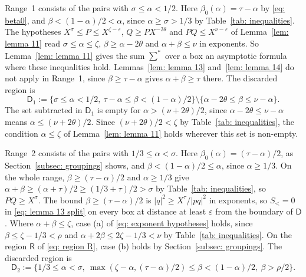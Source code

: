 \documentclass{article}
\numberwithin{equation}{section}
\newcommand{\Le}{\leqslant}
\newcommand{\Ge}{\geqslant}
\begin{document}
Range~1 consists of the pairs with $\sigma \Le \alpha < 1/2$. Here $\beta_0(\alpha) = \tau - \alpha$ by \eqref{eq: beta0}, and $\beta < (1 - \alpha)/2 < \alpha$, since $\alpha \Ge \sigma > 1/3$ by Table~\ref{tab: inequalities}. The hypotheses $X^{\sigma} \Le P \Le X^{\zeta - \varepsilon}$, $Q \Ge P X^{-2\theta}$ and $PQ \Le X^{\nu - \varepsilon}$ of Lemma~\ref{lem: lemma 11} read $\sigma \Le \alpha \Le \zeta$, $\beta \Ge \alpha - 2\theta$ and $\alpha + \beta \Le \nu$ in exponents. So Lemma~\ref{lem: lemma 11} gives the sum $\sum^*$ over a box an asymptotic formula where these inequalities hold. Lemmas~\ref{lem: lemma 13} and~\ref{lem: lemma 14} do not apply in Range~1, since $\beta \Ge \tau - \alpha$ gives $\alpha + \beta \Ge \tau$ there. The discarded region is
\begin{equation}
\label{eq: D1}
\mathsf{D}_1 := \bigl\{ \sigma \Le \alpha < 1/2,\ \tau - \alpha \Le \beta < (1 - \alpha)/2 \bigr\} \setminus \bigl\{ \alpha - 2\theta \Le \beta \Le \nu - \alpha \bigr\}.
\end{equation}
The set subtracted in $\mathsf{D}_1$ is empty for $\alpha > (\nu + 2\theta)/2$, since $\alpha - 2\theta \Le \nu - \alpha$ means $\alpha \Le (\nu + 2\theta)/2$. Since $(\nu + 2\theta)/2 < \zeta$ by Table~\ref{tab: inequalities}, the condition $\alpha \Le \zeta$ of Lemma~\ref{lem: lemma 11} holds wherever this set is non-empty.

Range~2 consists of the pairs with $1/3 \Le \alpha < \sigma$. Here $\beta_0(\alpha) = (\tau - \alpha)/2$, as Section~\ref{subsec: groupings} shows, and $\beta < (1 - \alpha)/2 \Le \alpha$, since $\alpha \Ge 1/3$. On the whole range, $\beta \Ge (\tau - \alpha)/2$ and $\alpha \Ge 1/3$ give $\alpha + \beta \Ge (\alpha + \tau)/2 \Ge (1/3 + \tau)/2 > \sigma$ by Table~\ref{tab: inequalities}, so $PQ \Ge X^{\sigma}$. The bound $\beta \Ge (\tau - \alpha)/2$ is $|q|^2 \Ge X^{\tau}/|pq|^2$ in exponents, so $S_< = 0$ in \eqref{eq: lemma 13 split} on every box at distance at least $\varepsilon$ from the boundary of $\mathsf{D}$. Where $\alpha + \beta \Le \zeta$, case (a) of \eqref{eq: exponent hypotheses} holds, since $\beta \Le \zeta - 1/3 < \rho$ and $\alpha + 2\beta \Le 2\zeta - 1/3 < \nu$ by Table~\ref{tab: inequalities}. On the region $\mathsf{R}$ of \eqref{eq: region R}, case (b) holds by Section~\ref{subsec: groupings}. The discarded region is
\begin{equation}
\label{eq: D2}
\mathsf{D}_2 := \bigl\{ 1/3 \Le \alpha < \sigma,\ \max(\zeta - \alpha, (\tau - \alpha)/2) \Le \beta < (1 - \alpha)/2,\ \beta > \rho/2 \bigr\}.
\end{equation}
\end{document}

